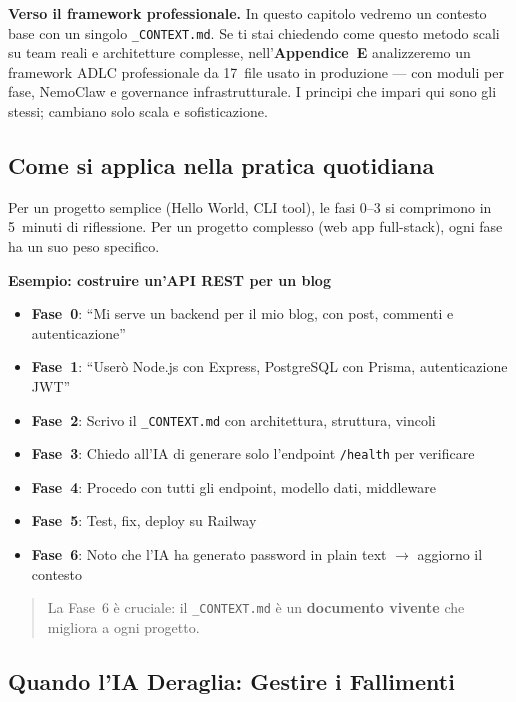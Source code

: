 \begin{notebox}
\textbf{Verso il framework professionale.} In questo capitolo vedremo un contesto base con un singolo \texttt{\_CONTEXT.md}. Se ti stai chiedendo come questo metodo scali su team reali e architetture complesse, nell'\textbf{Appendice~E} analizzeremo un framework ADLC professionale da 17~file usato in produzione --- con moduli per fase, NemoClaw e governance infrastrutturale. I principi che impari qui sono gli stessi; cambiano solo scala e sofisticazione.
\end{notebox}

\subsection{Come si applica nella pratica quotidiana}

Per un progetto semplice (Hello World, CLI tool), le fasi 0--3 si comprimono in 5~minuti di riflessione. Per un progetto complesso (web app full-stack), ogni fase ha un suo peso specifico.

\textbf{Esempio: costruire un'API REST per un blog}
\begin{itemize}
  \item \textbf{Fase~0}: ``Mi serve un backend per il mio blog, con post, commenti e autenticazione''
  \item \textbf{Fase~1}: ``Userò Node.js con Express, PostgreSQL con Prisma, autenticazione JWT''
  \item \textbf{Fase~2}: Scrivo il \texttt{\_CONTEXT.md} con architettura, struttura, vincoli
  \item \textbf{Fase~3}: Chiedo all'IA di generare solo l'endpoint \texttt{/health} per verificare
  \item \textbf{Fase~4}: Procedo con tutti gli endpoint, modello dati, middleware
  \item \textbf{Fase~5}: Test, fix, deploy su Railway
  \item \textbf{Fase~6}: Noto che l'IA ha generato password in plain text $\rightarrow$ aggiorno il contesto
\end{itemize}

\begin{quote}
La Fase~6 è cruciale: il \texttt{\_CONTEXT.md} è un \textbf{documento vivente} che migliora a ogni progetto.
\end{quote}

\subsection{Quando l'IA Deraglia: Gestire i Fallimenti}

